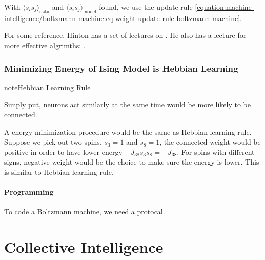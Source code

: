 \documentclass[letterpaper,10pt,english]{sphinxmanual}
\begin{document}
With \(\langle s_i s_j\rangle_{\mathrm{data}}\) and \(\langle s_i s_j\rangle_{\mathrm{model}}\) found, we use the update rule \eqref{equation:machine-intelligence/boltzmann-machine:eq-weight-update-rule-boltzmann-machine}.

For some reference, Hinton has a set of lectures on . He also has a lecture for more effective algrimths: .


\subsection{Minimizing Energy of Ising Model is Hebbian Learning}
\label{\detokenize{machine-intelligence/boltzmann-machine:minimizing-energy-of-ising-model-is-hebbian-learning}}
\begin{sphinxadmonition}{note}{Hebbian Learning Rule}

Simply put, neurons act similarly at the same time would be more likely to be connected.
\end{sphinxadmonition}

A energy minimization procedure would be the same as Hebbian learning rule. Suppose we pick out two spins, \(s_3 = 1\) and \(s_8= 1\), the connected weight would be positive in order to have lower energy \(-J_{38}s_3 s_8 = - J_{38}\). For spins with different signs, negative weight would be the choice to make sure the energy is lower. This is similar to Hebbian learning rule.


\subsubsection{Programming}
\label{\detokenize{machine-intelligence/boltzmann-machine:programming}}
To code a Boltzmann machine, we need a protocal.


\chapter{Collective Intelligence}
\label{\detokenize{collective/index::doc}}\label{\detokenize{collective/index:collective-intelligence}}
\end{document}
